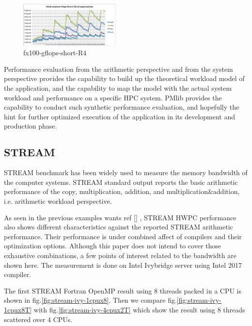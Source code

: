 \documentclass[conference]{IEEEtran}
\begin{document}
\begin{figure}[tb]
\centering
\includegraphics[width=0.45\textwidth]{figs/fx100-gflops-short-R4.pdf}
\caption{fx100-gflops-short-R4}
\label{fig:fx100-gflops-short-R4}
\end{figure}

Performance evaluation from the arithmetic perspective and from the
system perspective provides the capability to build up the theoretical
workload model of the application,
and the capability to map the model with the actual system workload
and performance on a specific HPC system.
PMlib provides the capability to conduct such synthetic performance
evaluation, and hopefully the hint for further optimized execution of
the application in its development and production phase.


\subsection{STREAM}
\label{subsection:STREAM}
STREAM benchmark \cite{stream:1995}
has been widely used to measure the memory bandwidth of the computer systems.
STREAM standard output reports the
basic arithmetic performance of the copy, multiplication, addition,
and multiplication\&addition, i.e. arithmetic workload perspective.

As seen in the previous examples {\color{blue}wants ref \ref{} }, STREAM
HWPC performance also shows different characteristics against
the reported STREAM arithmetic performance. Their performance is under
combined affect of compilers and their optimization options.
Although this paper does not intend to cover those exhaustive combinations,
a few points of interest related to the bandwidth are shown here.
%
The measurement is done on Intel Ivybridge server using Intel 2017 compiler.

The first STREAM Fortran OpenMP result using 8 threads packed in a CPU
is shown in fig.\ref{fig:stream-ivy-1cpux8}.
Then we compare fig.\ref{fig:stream-ivy-1cpux8T}
with
fig.\ref{fig:stream-ivy-4cpux2T} 
which show the result using 8 threads scattered over 4 CPUs.


\end{document}

